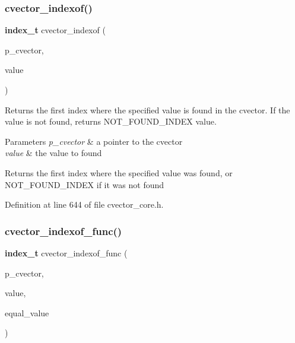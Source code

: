 \mbox{\label{cvector__core_8h_aa11c7cb1423cfd6d9d41404188659f42}} 
\subsubsection{cvector\+\_\+indexof()}
{\footnotesize\ttfamily \textbf{ index\+\_\+t} cvector\+\_\+indexof (\begin{DoxyParamCaption}\item[{\textbf{ cvector} $\ast$}]{p\+\_\+cvector,  }\item[{\textbf{ value\+\_\+t}}]{value }\end{DoxyParamCaption})}

Returns the first index where the specified value is found in the cvector. If the value is not found, returns N\+O\+T\+\_\+\+F\+O\+U\+N\+D\+\_\+\+I\+N\+D\+EX value. 
\begin{DoxyParams}{Parameters}
{\em p\+\_\+cvector} & a pointer to the cvector \\
\hline
{\em value} & the value to found \\
\hline
\end{DoxyParams}
\begin{DoxyReturn}{Returns}
the first index where the specified value was found, or N\+O\+T\+\_\+\+F\+O\+U\+N\+D\+\_\+\+I\+N\+D\+EX if it was not found 
\end{DoxyReturn}


Definition at line 644 of file cvector\+\_\+core.\+h.

\mbox{\label{cvector__core_8h_a4d82b0c6d906d0b979ecabd6073ca242}} 
\subsubsection{cvector\+\_\+indexof\+\_\+func()}
{\footnotesize\ttfamily \textbf{ index\+\_\+t} cvector\+\_\+indexof\+\_\+func (\begin{DoxyParamCaption}\item[{\textbf{ cvector} $\ast$}]{p\+\_\+cvector,  }\item[{\textbf{ value\+\_\+t}}]{value,  }\item[{bool($\ast$)(\textbf{ value\+\_\+t}, \textbf{ value\+\_\+t})}]{equal\+\_\+value }\end{DoxyParamCaption})}

